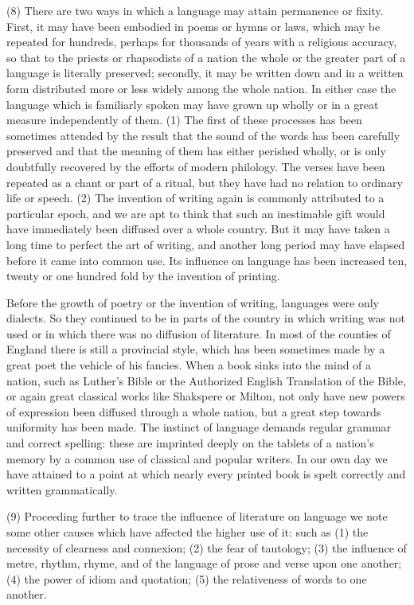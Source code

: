 \documentclass[11pt,letter]{article}
\begin{document}
\par  (8) There are two ways in which a language may attain permanence or fixity. First, it may have been embodied in poems or hymns or laws, which may be repeated for hundreds, perhaps for thousands of years with a religious accuracy, so that to the priests or rhapsodists of a nation the whole or the greater part of a language is literally preserved; secondly, it may be written down and in a written form distributed more or less widely among the whole nation. In either case the language which is familiarly spoken may have grown up wholly or in a great measure independently of them. (1) The first of these processes has been sometimes attended by the result that the sound of the words has been carefully preserved and that the meaning of them has either perished wholly, or is only doubtfully recovered by the efforts of modern philology. The verses have been repeated as a chant or part of a ritual, but they have had no relation to ordinary life or speech. (2) The invention of writing again is commonly attributed to a particular epoch, and we are apt to think that such an inestimable gift would have immediately been diffused over a whole country. But it may have taken a long time to perfect the art of writing, and another long period may have elapsed before it came into common use. Its influence on language has been increased ten, twenty or one hundred fold by the invention of printing.

\par  Before the growth of poetry or the invention of writing, languages were only dialects. So they continued to be in parts of the country in which writing was not used or in which there was no diffusion of literature. In most of the counties of England there is still a provincial style, which has been sometimes made by a great poet the vehicle of his fancies. When a book sinks into the mind of a nation, such as Luther’s Bible or the Authorized English Translation of the Bible, or again great classical works like Shakspere or Milton, not only have new powers of expression been diffused through a whole nation, but a great step towards uniformity has been made. The instinct of language demands regular grammar and correct spelling: these are imprinted deeply on the tablets of a nation’s memory by a common use of classical and popular writers. In our own day we have attained to a point at which nearly every printed book is spelt correctly and written grammatically.

\par  (9) Proceeding further to trace the influence of literature on language we note some other causes which have affected the higher use of it: such as (1) the necessity of clearness and connexion; (2) the fear of tautology; (3) the influence of metre, rhythm, rhyme, and of the language of prose and verse upon one another; (4) the power of idiom and quotation; (5) the relativeness of words to one another.
\end{document}
